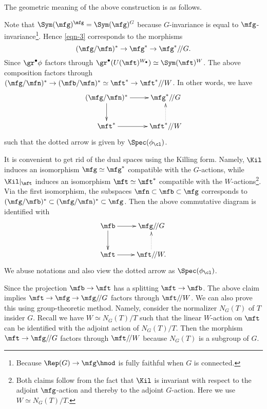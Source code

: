 	\begin{rem}
		\label{rem-geometric-Chevalley}
		The geometric meaning of the above construction is as follows. 

		Note that $\Sym(\mfg)^\mfg = \Sym(\mfg)^G$ because $G$-invariance is equal to $\mfg$-invariance\footnote{Because $\Rep(G) \to \mfg\hmod$ is fully faithful when $G$ is connected.}. Hence \eqref{eqn-3} corresponds to the morphisms
		\[
			(\mfg/\mfn)^* \to \mfg^* \to \mfg^*/\!/G.
		\]
		Since $\gr^\bullet \phi$ factors through $\gr^\bullet(U(\mft)^{W_\bullet}) \simeq \Sym(\mft)^W$. The above composition factors through $(\mfg/\mfn)^* \to (\mfb/\mfn)^* \simeq \mft^* \to \mft^*/\!/W$. In other words, we have
		\[
			\xymatrix{
				(\mfg/\mfn)^* \ar[r] \ar[d] & \mfg^*/\!/G  \\
				\mft^* \ar[r] & \mft^*/\!/W \ar@{.>}[u]
			}
		\]
		such that the dotted arrow is given by $\Spec(\phi_\cl)$.

		It is convenient to get rid of the dual spaces using the Killing form. Namely, $\Kil$ induces an isomorphism $\mfg\simeq \mfg^*$ compatible with the $G$-actions, while $\Kil|_\mft$ induces an isomorphism $\mft\simeq \mft^*$ compatible with the $W$-actions\footnote{Both claims follow from the fact that $\Kil$ is invariant with respect to the adjoint $\mfg$-action and thereby to the adjoint $G$-action. Here we use $W\simeq N_G(T)/T$.}. Via the first isomorphism, the subspaces $\mfn\subset \mfb\subset \mfg$ corresponds to $(\mfg/\mfb)^*\subset (\mfg/\mfn)^* \subset \mfg$. Then the above commutative diagram is identified with
		\begin{equation}
			\label{eqn-square}
			\xymatrix{
				\mfb \ar[r] \ar[d] & \mfg/\!/G  \\
				\mft \ar[r] & \mft/\!/W. \ar@{.>}[u]
			}
		\end{equation}
		We abuse notations and also view the dotted arrow as $\Spec(\phi_\cl)$.

	\end{rem}

	\begin{rem}
		Since the projection $\mfb\to \mft$ has a splitting $\mft \to \mfb$. The above claim implies $\mft \to \mfg \to \mfg/\!/G$ factors through $\mft/\!/ W$. We can also prove this using group-theoretic method. Namely, consider the normalizer $N_G(T)$ of $T$ insider $G$. Recall we have $W\simeq N_G(T)/T$ such that the linear $W$-action on $\mft$ can be identified with the adjoint action of $N_G(T)/T$. Then the morphism $\mft \to  \mfg/\!/G$ factors through $\mft/\!/ W$ because $N_G(T)$ is a subgroup of $G$.
	\end{rem}

